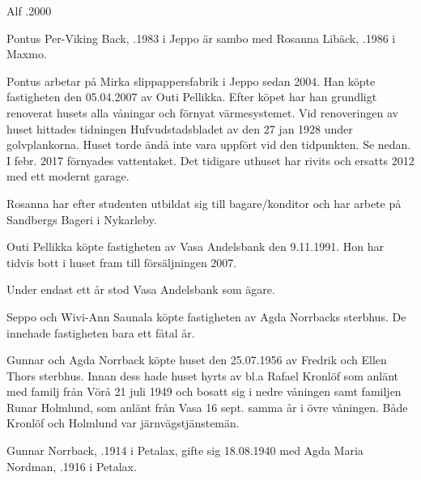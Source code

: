 Alf .2000




Pontus Per-Viking Back, .1983 i Jeppo är sambo med Rosanna Libäck, .1986 i Maxmo.
\begin{jhchildren}
  \item {}
  \item {}
\end{jhchildren}



Pontus arbetar på Mirka slippappersfabrik i Jeppo sedan 2004. Han köpte fastigheten den 05.04.2007 av Outi Pellikka. Efter köpet har han grundligt renoverat husets alla våningar och förnyat värmesystemet. Vid renoveringen av huset hittades tidningen Hufvudstadsbladet av	den 27 jan 1928 under golvplankorna. Huset torde ändå inte vara	uppfört vid den tidpunkten. Se nedan. I febr. 2017 förnyades vattentaket. Det tidigare uthuset har rivits och ersatts 2012 med ett modernt garage.

Rosanna har efter studenten utbildat sig till bagare/konditor och	har arbete på Sandbergs Bageri i Nykarleby.



Outi Pellikka köpte fastigheten av Vasa Andelsbank den 9.11.1991. Hon har tidvis bott i huset fram till försäljningen 2007.



Under endast ett år stod Vasa Andelsbank som ägare.



Seppo och Wivi-Ann Saunala köpte fastigheten av Agda Norrbacks sterbhus. De innehade fastigheten bara ett fåtal år.



Gunnar och Agda Norrback köpte huset den 25.07.1956 av Fredrik och Ellen Thors sterbhus. Innan dess hade huset hyrts av bl.a Rafael Kronlöf som anlänt med familj från Vörå 21 juli 1949 och bosatt sig i	nedre våningen samt familjen Runar Holmlund, som anlänt från Vasa 16 sept. samma år i övre våningen. Både Kronlöf och Holmlund var järnvägstjänstemän.

Gunnar Norrback, .1914 i Petalax, gifte sig 18.08.1940 med Agda Maria Nordman, .1916 i Petalax.
\begin{jhchildren}
  \item {}
  \item {}
\end{jhchildren}

